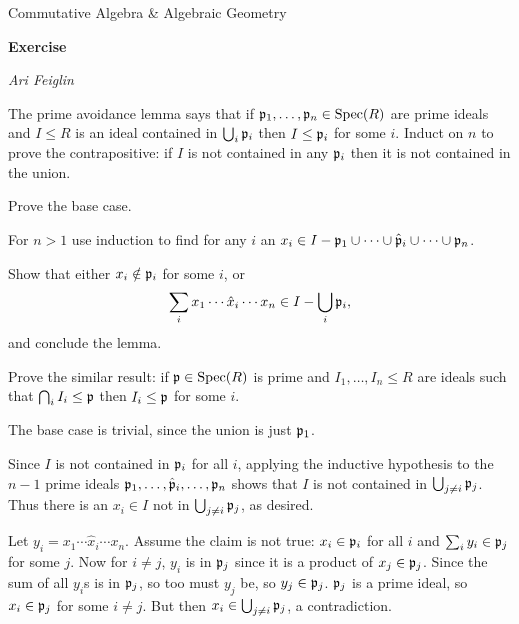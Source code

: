 


\def\enumindent{0cm}

\def\printmcount{\the\counter{section}.\the\counter{math counter}}
\setcounter{section}{4}

\centerline{Commutative Algebra \& Algebraic Geometry}
\medskip
\centerline{\bf Exercise \the{}}
\smallskip
\centerline{\it Ari Feiglin}

\bprob

    The {\emphcolor prime avoidance lemma} says that if ${{\frak p}}_1,\dots,{{\frak p}}_n\in{\rm Spec}(R)$ are prime ideals and $I\leq R$ is
    an ideal contained in $\bigcup_i{{\frak p}}_i$ then $I\leq{{\frak p}}_i$ for some $i$.
    Induct on $n$ to prove the contrapositive: if $I$ is not contained in any ${{\frak p}}_i$ then it is not contained in the union.
    \benum
        \item Prove the base case.
        \item For $n>1$ use induction to find for any $i$ an $x_i\in I-{{\frak p}}_1\cup\cdots\cup\hat{{{\frak p}}}_i\cup\cdots\cup{{\frak p}}_n$.
        \item Show that either $x_i\notin{{\frak p}}_i$ for some $i$, or
        $$ \sum_i x_1\cdots\hat x_i\cdots x_n \in I-\bigcup_i{{\frak p}}_i , $$
        and conclude the lemma.
        \item Prove the similar result: if ${{\frak p}}\in{\rm Spec}(R)$ is prime and $I_1,\dots,I_n\leq R$ are ideals such that
        $\bigcap_iI_i\leq{{\frak p}}$ then $I_i\leq{{\frak p}}$ for some $i$.
    \eenum

\eprob

\benum
    \item The base case is trivial, since the union is just ${{\frak p}}_1$.

    \item Since $I$ is not contained in ${{\frak p}}_i$ for all $i$, applying the inductive hypothesis to the $n-1$ prime ideals
    ${{\frak p}}_1,\dots,\hat{{{\frak p}}}_i,\dots,{{\frak p}}_n$ shows that $I$ is not contained in $\bigcup_{j\neq i}{{\frak p}}_j$.
    Thus there is an $x_i\in I$ not in $\bigcup_{j\neq i}{{\frak p}}_j$, as desired.

    \item Let $y_i=x_1\cdots\hat x_i\cdots x_n$.
    Assume the claim is not true: $x_i\in{{\frak p}}_i$ for all $i$ and $\sum_iy_i\in{{\frak p}}_j$ for some $j$.
    Now for $i\neq j$, $y_i$ is in ${{\frak p}}_j$ since it is a product of $x_j\in{{\frak p}}_j$.
    Since the sum of all $y_i$s is in ${{\frak p}}_j$, so too must $y_j$ be, so $y_j\in{{\frak p}}_j$.
    ${{\frak p}}_j$ is a prime ideal, so $x_i\in{{\frak p}}_j$ for some $i\neq j$.
    But then $x_i\in\bigcup_{j\neq i}{{\frak p}}_j$, a contradiction.

